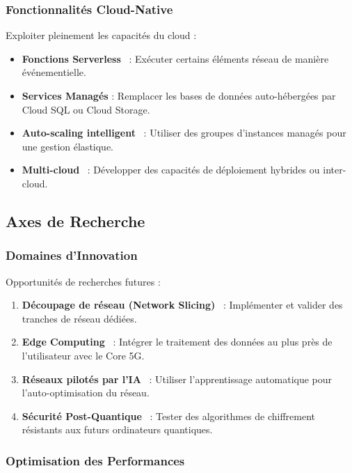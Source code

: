 \documentclass[12pt,a4paper]{report}
\begin{document}
\subsubsection{Fonctionnalités Cloud-Native}

Exploiter pleinement les capacités du cloud :

\begin{itemize}
    \item \textbf{Fonctions Serverless}~\cite{serverless-functions} : Exécuter certains éléments réseau de manière événementielle.
    \item \textbf{Services Managés} : Remplacer les bases de données auto-hébergées par Cloud SQL ou Cloud Storage.
    \item \textbf{Auto-scaling intelligent}~\cite{auto-scaling} : Utiliser des groupes d'instances managés pour une gestion élastique.
    \item \textbf{Multi-cloud}~\cite{multi-cloud} : Développer des capacités de déploiement hybrides ou inter-cloud.
\end{itemize}

\subsection{Axes de Recherche}

\subsubsection{Domaines d'Innovation}

Opportunités de recherches futures :

\begin{enumerate}
    \item \textbf{Découpage de réseau (Network Slicing)}~\cite{network-slicing} : Implémenter et valider des tranches de réseau dédiées.
    \item \textbf{Edge Computing}~\cite{edge-computing} : Intégrer le traitement des données au plus près de l'utilisateur avec le Core 5G.
    \item \textbf{Réseaux pilotés par l'IA}~\cite{ai-networking} : Utiliser l'apprentissage automatique pour l'auto-optimisation du réseau.
    \item \textbf{Sécurité Post-Quantique}~\cite{quantum-crypto} : Tester des algorithmes de chiffrement résistants aux futurs ordinateurs quantiques.
\end{enumerate}

\subsubsection{Optimisation des Performances}
\end{document}
